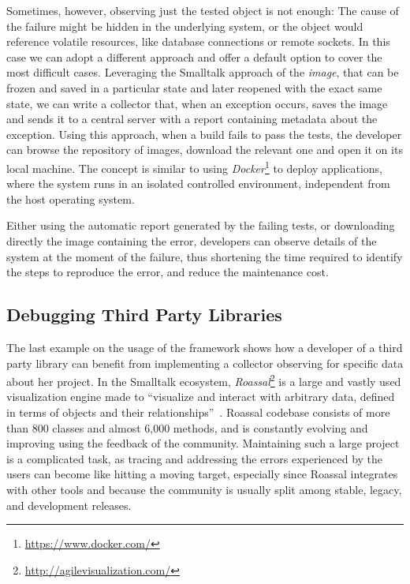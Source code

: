 Sometimes, however, observing just the tested object is not enough: The cause of the failure might be hidden in the underlying system, or the object would reference volatile resources, like database connections or remote sockets.
In this case we can adopt a different approach and offer a default option to cover the most difficult cases.
Leveraging the Smalltalk approach of the \emph{image}, that can be frozen and saved in a particular state and later reopened with the exact same state, we can write a collector that, when an exception occurs, saves the image and sends it to a central server with a report containing metadata about the exception.
Using this approach, when a build fails to pass the tests, the developer can browse the repository of images, download the relevant one and open it on its local machine.
The concept is similar to using \emph{Docker}\footnote{\url{https://www.docker.com/}} to deploy applications, where the system runs in an isolated controlled environment, independent from the host operating system.

Either using the automatic report generated by the failing tests, or downloading directly the image containing the error, developers can observe details of the system at the moment of the failure, thus shortening the time required to identify the steps to reproduce the error, and reduce the maintenance cost.

\subsection{Debugging Third Party Libraries}\label{sec:reified-story-libraries}

The last example on the usage of the framework shows how a developer of a third party library can benefit from implementing a collector observing for specific data about her project.
In the Smalltalk ecosystem, \emph{Roassal}\footnote{\url{http://agilevisualization.com/}} is a large and vastly used visualization engine made to ``visualize and interact with arbitrary data, defined in terms of objects and their relationships''~\cite{Aray2013a}.
Roassal codebase consists of more than 800 classes and almost 6,000 methods, and is constantly evolving and improving using the feedback of the community.
Maintaining such a large project is a complicated task, as tracing and addressing the errors experienced by the users can become like hitting a moving target, especially since Roassal integrates with other tools and because the community is usually split among stable, legacy, and development releases.

